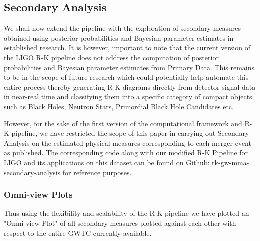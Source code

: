 \subsection{Secondary Analysis}

    We shall now extend the pipeline with the  exploration of secondary measures obtained using posterior probabilities and Bayesian parameter estimates in established research. \cite{24.0_BinaryMergerIdentification} \cite{24.4_CompactBinaryParameterEstimates} \cite{24.5_GWParameterEsitmation} \cite{24.6_LIGOParameterEstimates} It is however, important to note that the current version of the LIGO R-K pipeline does not address the computation of posterior probabilities and Bayesian parameter estimates from Primary Data. This remains to be in the scope of future research which could potentially help automate this entire process thereby generating R-K diagrams directly from detector signal data in near-real time and classifying them into a specific category of compact objects such as Black Holes, Neutron Stars, Primordial Black Hole Candidates etc.

    However, for the sake of the first version of the computational framework and R-K pipeline, we have restricted the scope of this paper in carrying out Secondary Analysis on the estimated physical measures corresponding to each merger event as published. \cite{00_LIGOOpenSciData} \cite{00.7_LIGOBayesianAnalysis} \cite{00.6_LIGOAnalysisPipeline} The corresponding code along with our modified R-K Pipeline for LIGO and its applications on this dataset can be found on \href{https://github.com/animikhroy/rk_toolkit_pipeline_diagrams/tree/main/02_notebooks/rk_gw_mma}{Github: rk-gw-mma-secondary-analysis} for reference purposes.

    \subsubsection{Omni-view Plots}

    Thus using the flexibility and scalability of the R-K pipeline we have plotted an "Omni-view Plot" of all secondary measures plotted against each other with respect to the entire GWTC currently available.

